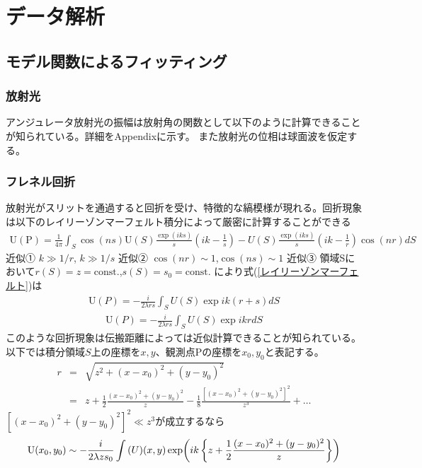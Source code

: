 \documentclass[a4paper,11pt,uplatex]{jsbook}
\begin{document}
\chapter{データ解析}
\section{モデル関数によるフィッティング}
\subsection{放射光}
アンジュレータ放射光の振幅は放射角の関数として以下のように計算できることが知られている。詳細をAppendixに示す。
また放射光の位相は球面波を仮定する。

\subsection{フレネル回折}
放射光がスリットを通過すると回折を受け、特徴的な縞模様が現れる。回折現象は以下のレイリーゾンマーフェルト積分によって厳密に計算することができる
\begin{eqnarray}
  \text{U}(\text{P}) = \frac{1}{4\pi}\int_{S}\cos(ns)\text{U}(S)\frac{\exp(iks)}{s}\left( ik - \frac{1}{s}\right) -U(S)\frac{\exp(iks)}{s}\left(ik- \frac{1}{r}\right)\cos(nr) dS
\label{レイリーゾンマーフェルト}
\end{eqnarray}
近似① $k \gg 1/r$, $k \gg 1/s$
近似② $\cos(nr) \sim 1$,$\cos(ns) \sim 1$
近似③ 領域Sにおいて$r(S)= z = \text{const.}$,$s(S) = s_0 = \text{const.}$
により式(\ref{レイリーゾンマーフェルト})は
\begin{eqnarray}
  \text{U}(P) = -\frac{i}{2\lambda rs} \int_{S} U(S)\exp ik(r+s) dS
  \label{レイリーゾンマーフェルト近似}
\end{eqnarray}
\begin{eqnarray}
  \text{U}(P) = -\frac{i}{2\lambda rs} \int_{S} U(S)\exp ikr dS
\end{eqnarray}
このような回折現象は伝搬距離によっては近似計算できることが知られている。以下では積分領域$S$上の座標を$x,y$、観測点Pの座標を$x_0,y_0$と表記する。
\begin{eqnarray}
  r &=& \sqrt{z^2 + (x-x_0)^2 + (y-y_0)^2}\\
  &=& z + \frac{1}{2}\frac{(x-x_0)^2 + (y-y_0)^2}{z} - \frac{1}{8}\frac{\left[(x-x_0)^2 + (y-y_0)^2\right]^2}{z^3} +\dots
\end{eqnarray}
$\left[(x-x_0)^2 + (y-y_0)^2\right]^2 \ll z^3$が成立するなら
\begin{eqnarray}
  \text{U}(x_0,y_0) \sim -\frac{i}{2\lambda zs_0}\int \text(U)(x,y) \exp(ik\left\{z +\frac{1}{2}\frac{(x-x_0)^2 + (y-y_0)^2}{z}\right\})
\end{eqnarray}
\end{document}

